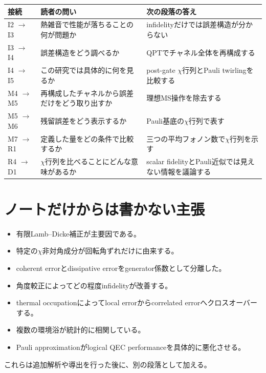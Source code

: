 \documentclass[dvipdfmx,a4paper,11pt]{jsarticle}
\begin{document}
\renewcommand{\arraystretch}{1.35}
\small
\noindent
\begin{tabularx}{\textwidth}{@{}lXX@{}}
  \toprule
  接続 & 読者の問い & 次の段落の答え \\
  \midrule
  I2 $\rightarrow$ I3
    & 熱雑音で性能が落ちることの何が問題か
    & infidelityだけでは誤差構造が分からない \\
  I3 $\rightarrow$ I4
    & 誤差構造をどう調べるか
    & QPTでチャネル全体を再構成する \\
  I4 $\rightarrow$ I5
    & この研究では具体的に何を見るか
    & post-gate $\chi$行列とPauli twirlingを比較する \\
  M4 $\rightarrow$ M5
    & 再構成したチャネルから誤差だけをどう取り出すか
    & 理想MS操作を除去する \\
  M5 $\rightarrow$ M6
    & 残留誤差をどう表示するか
    & Pauli基底の$\chi$行列で表す \\
  M7 $\rightarrow$ R1
    & 定義した量をどの条件で比較するか
    & 三つの平均フォノン数で$\chi$行列を示す \\
  R4 $\rightarrow$ D1
    & $\chi$行列を比べることにどんな意味があるか
    & scalar fidelityとPauli近似では見えない情報を議論する \\
  \bottomrule
\end{tabularx}
\normalsize

\section{ノートだけからは書かない主張}

\begin{itemize}
  \item 有限Lamb--Dicke補正が主要因である。
  \item 特定の$\chi$非対角成分が回転角ずれだけに由来する。
  \item coherent errorとdissipative errorをgenerator係数として分離した。
  \item 角度較正によってどの程度infidelityが改善する。
  \item thermal occupationによってlocal errorからcorrelated errorへクロスオーバーする。
  \item 複数の環境浴が統計的に相関している。
  \item Pauli approximationがlogical QEC performanceを具体的に悪化させる。
\end{itemize}

これらは追加解析や導出を行った後に、別の段落として加える。
\end{document}
